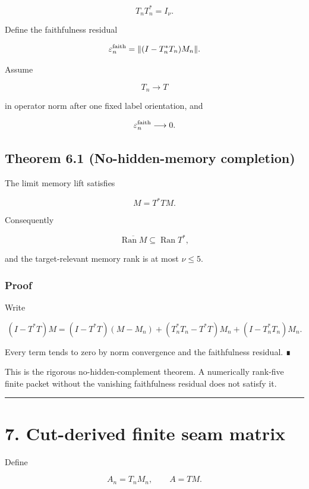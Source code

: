 \[
T_nT_n^*=I_\nu.
\]

Define the faithfulness residual

\[
\varepsilon_n^{\rm faith}
=
\|(I-T_n^*T_n)M_n\|.
\]

Assume

\[
T_n\longrightarrow T
\]

in operator norm after one fixed label orientation, and

\[
\varepsilon_n^{\rm faith}\longrightarrow0.
\]

\hypertarget{theorem-6.1-no-hidden-memory-completion}{%
\subsection{Theorem 6.1 (No-hidden-memory completion)}\label{theorem-6.1-no-hidden-memory-completion}}

The limit memory lift satisfies

\[
\boxed{
M=T^*TM.
}
\]

Consequently

\[
\overline{\operatorname{Ran}M}
\subseteq
\operatorname{Ran}T^*,
\]

and the target-relevant memory rank is at most \(\nu\le5\).

\hypertarget{proof-1}{%
\subsubsection{Proof}\label{proof-1}}

Write

\[
(I-T^*T)M
=
(I-T^*T)(M-M_n)
+
(T_n^*T_n-T^*T)M_n
+
(I-T_n^*T_n)M_n.
\]

Every term tends to zero by norm convergence and the faithfulness residual. ∎

This is the rigorous no-hidden-complement theorem. A numerically rank-five
finite packet without the vanishing faithfulness residual does not satisfy it.

\begin{center}\rule{0.5\linewidth}{0.5pt}\end{center}

\hypertarget{cut-derived-finite-seam-matrix}{%
\section{7. Cut-derived finite seam matrix}\label{cut-derived-finite-seam-matrix}}

Define

\[
A_n=T_nM_n,
\qquad
A=TM.
\]

